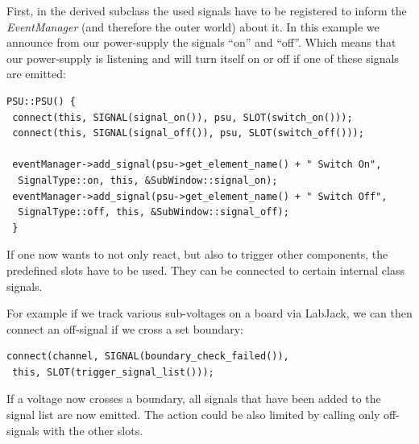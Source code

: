 \documentclass[10pt,a4paper]{article}
\begin{document}
		First, in the derived subclass the used signals have to be registered to inform the \textit{EventManager} (and therefore the outer world) about it. In this example we announce from our power-supply the signals \enquote{on} and \enquote{off}. Which means that our power-supply is listening and will turn itself on or off if one of these signals are emitted:

\newpage		
\begin{lstlisting}[caption=PSU.cpp]
PSU::PSU() {
 connect(this, SIGNAL(signal_on()), psu, SLOT(switch_on()));
 connect(this, SIGNAL(signal_off()), psu, SLOT(switch_off()));

 eventManager->add_signal(psu->get_element_name() + " Switch On",
  SignalType::on, this, &SubWindow::signal_on);
 eventManager->add_signal(psu->get_element_name() + " Switch Off",
  SignalType::off, this, &SubWindow::signal_off);
 }
\end{lstlisting}

If one now wants to not only react, but also to trigger other components, the predefined slots have to be used. They can be connected to certain internal class signals. 

For example if we track various sub-voltages on a board via LabJack, we can then connect an off-signal if we cross a set boundary:

\begin{lstlisting}[caption=PSU.cpp]
connect(channel, SIGNAL(boundary_check_failed()),
 this, SLOT(trigger_signal_list()));
\end{lstlisting}

If a voltage now crosses a boundary, all signals that have been added to the signal list are now emitted. The action could be also limited by calling only off-signals with the other slots.
\end{document}
